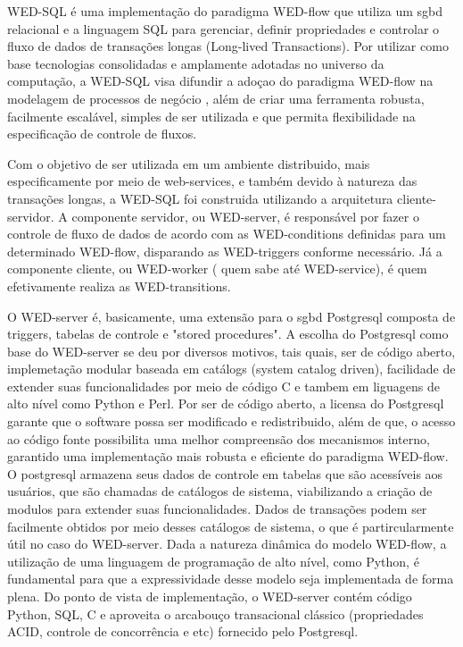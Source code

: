 


  WED-SQL é uma implementação do paradigma WED-flow que utiliza um sgbd relacional e a linguagem SQL para gerenciar,
definir propriedades e controlar o fluxo de dados de transações longas (Long-lived Transactions). Por utilizar
como base tecnologias consolidadas e amplamente adotadas no universo da computação, a WED-SQL visa difundir a adoçao
do paradigma WED-flow na modelagem de processos de negócio , além de criar uma ferramenta robusta, facilmente
escalável, simples de ser utilizada e que permita flexibilidade na especificação de controle de fluxos.


  Com o objetivo de  ser utilizada em um ambiente distribuido, mais especificamente por meio de web-services, e também
devido à natureza das transações longas, a WED-SQL foi construida utilizando a arquitetura cliente-servidor. A componente
servidor, ou WED-server, é responsável por fazer o controle de fluxo de dados de acordo com as WED-conditions definidas
para um determinado WED-flow, disparando as WED-triggers conforme necessário. Já a componente cliente, ou WED-worker (
quem sabe até WED-service), é quem efetivamente realiza as WED-transitions.

  O WED-server é, basicamente, uma extensão para o sgbd Postgresql composta de triggers, tabelas de controle e "stored
procedures". A escolha do Postgresql como base do WED-server se deu por diversos motivos, tais quais, ser de código aberto, 
implemetação modular baseada em catálogs (system catalog driven), facilidade de extender suas funcionalidades por meio de
código C e tambem em liguagens de alto nível como Python e Perl. Por ser de código aberto, a licensa do Postgresql garante
que o software possa ser modificado e redistribuido, além de que, o acesso ao código fonte possibilita uma melhor compreensão
dos mecanismos interno, garantido uma implementação mais robusta e eficiente do paradigma WED-flow. O postgresql armazena seus
dados de controle em tabelas que são acessíveis aos usuários, que são chamadas de catálogos de sistema, viabilizando a 
criação de modulos para extender suas funcionalidades. Dados de transações podem ser facilmente obtidos por meio desses 
catálogos de sistema, o que é partircularmente útil no caso do WED-server. Dada a natureza dinâmica do modelo WED-flow,
a utilização de uma linguagem de programação de alto nível, como Python, é fundamental para que a expressividade desse
modelo seja implementada de forma plena. Do ponto de vista de implementação, o WED-server contém código Python, SQL, C e 
aproveita o arcabouço transacional clássico (propriedades ACID, controle de concorrência e etc) fornecido pelo Postgresql.

